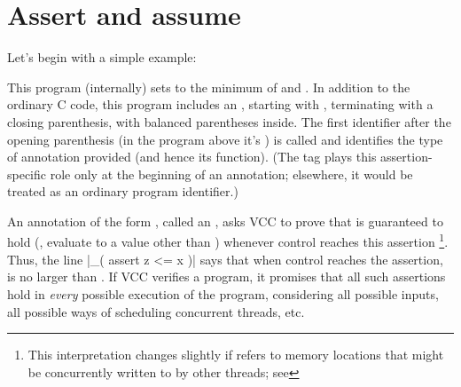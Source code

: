 \section{Assert and assume}
\label{sect:assert-assume}


Let's begin with a simple example:

This program (internally) sets  to the minimum of  and
. In addition to the ordinary C code, this program includes an
, starting with \vcc{_(}, terminating with a closing
parenthesis, with balanced parentheses inside. The first identifier
after the opening parenthesis (in the program above it's )
is called  and
identifies the type of annotation provided (and hence its function).
(The tag plays this assertion-specific role only 
at the beginning of an annotation; elsewhere, it would be treated as
an ordinary program identifier.)

An annotation of the form , called an , asks VCC to prove that
 is guaranteed to hold (\ie, evaluate to a value other than )
whenever control reaches this assertion%
\footnote{
  This interpretation changes slightly if  refers to
  memory locations that might be concurrently written to by other
  threads; see }.  
Thus, the line \vcc|_( assert z <= x )| says
that when control reaches the assertion,  is no larger than .
If VCC verifies a program, it promises that all such assertions
hold in \emph{every} possible execution of the program, considering all possible inputs,
all possible ways of scheduling concurrent threads, etc. 

